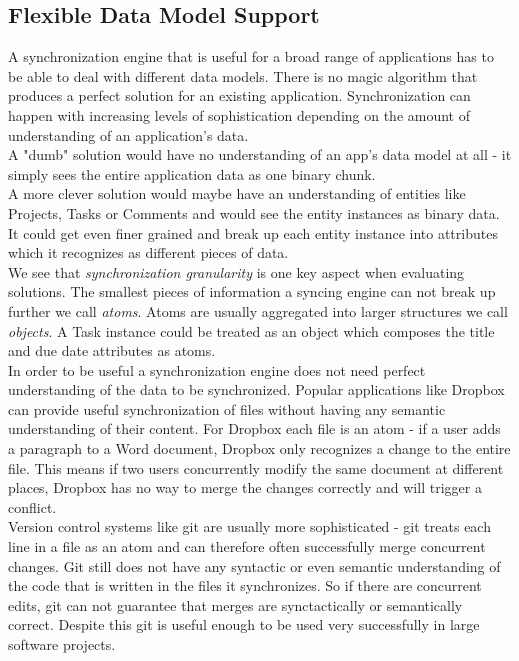 \subsection{Flexible Data Model Support}
A synchronization engine that is useful for a broad range of applications has to be able to deal with different data models. There is no magic algorithm that produces a perfect solution for an existing application. Synchronization can happen with increasing levels of sophistication depending on the amount of understanding of an application's data.\\
A "dumb" solution would have no understanding of an app's data model at all - it simply sees the entire application data as one binary chunk.\\
A more clever solution would maybe have an understanding of entities like Projects, Tasks or Comments and would see the entity instances as binary data.\\
It could get even finer grained and break up each entity instance into attributes which it recognizes as different pieces of data.\\
We see that \emph{synchronization granularity} is one key aspect when evaluating solutions. The smallest pieces of information a syncing engine can not break up further we call \emph{atoms}. Atoms are usually aggregated into larger structures we call \emph{objects}. A Task instance could be treated as an object which composes the title and due date attributes as atoms.\\
In order to be useful a synchronization engine does not need perfect understanding of the data to be synchronized. Popular applications like Dropbox can provide useful synchronization of files without having any semantic understanding of their content. For Dropbox each file is an atom - if a user adds a paragraph to a Word document, Dropbox only recognizes a change to the entire file. This means if two users concurrently modify the same document at different places, Dropbox has no way to merge the changes correctly and will trigger a conflict.\\
Version control systems like git are usually more sophisticated - git treats each line in a file as an atom and can therefore often successfully merge concurrent changes. Git still does not have any syntactic or even semantic understanding of the code that is written in the files it synchronizes. So if there are concurrent edits, git can not guarantee that merges are synctactically or semantically correct. Despite this git is useful enough to be used very successfully in large software projects.\\

